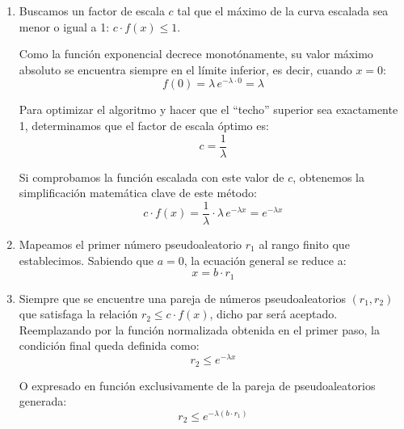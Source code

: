 \documentclass{article}
\begin{document}
\begin{enumerate}
    \item Buscamos un factor de escala $c$ tal que el máximo de la curva escalada sea
          menor o igual a 1: $c \cdot f(x) \leq 1$.

          Como la función exponencial decrece monotónamente, su valor máximo absoluto
          se encuentra siempre en el límite inferior, es decir, cuando $x = 0$:
          \begin{equation}
              f(0) = \lambda\, e^{-\lambda \cdot 0} = \lambda
          \end{equation}

          Para optimizar el algoritmo y hacer que el ``techo'' superior sea exactamente 1,
          determinamos que el factor de escala óptimo es:
          \begin{equation}
              c = \frac{1}{\lambda}
          \end{equation}

          Si comprobamos la función escalada con este valor de $c$, obtenemos la
          simplificación matemática clave de este método:
          \begin{equation}
              c \cdot f(x) = \frac{1}{\lambda} \cdot \lambda\, e^{-\lambda x} = e^{-\lambda x}
          \end{equation}

    \item Mapeamos el primer número pseudoaleatorio $r_1$ al rango finito que
          establecimos. Sabiendo que $a = 0$, la ecuación general se reduce a:
          \begin{equation}
              x = b \cdot r_1
          \end{equation}

    \item Siempre que se encuentre una pareja de números pseudoaleatorios $(r_1, r_2)$
          que satisfaga la relación $r_2 \leq c \cdot f(x)$, dicho par será aceptado.
          Reemplazando por la función normalizada obtenida en el primer paso, la condición
          final queda definida como:
          \begin{equation}
              r_2 \leq e^{-\lambda x}
          \end{equation}

          O expresado en función exclusivamente de la pareja de pseudoaleatorios
          generada:
          \begin{equation}
              r_2 \leq e^{-\lambda(b \cdot r_1)}
          \end{equation}
\end{enumerate}
\end{document}
